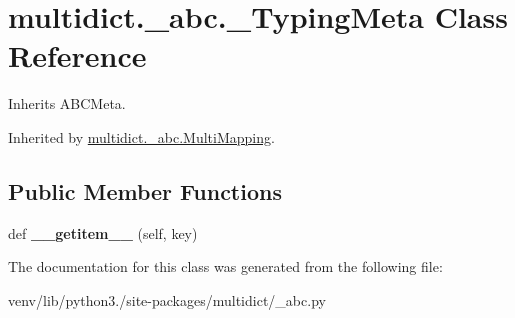 \hypertarget{classmultidict_1_1__abc_1_1___typing_meta}{}\section{multidict.\+\_\+abc.\+\_\+\+Typing\+Meta Class Reference}
\label{classmultidict_1_1__abc_1_1___typing_meta}


Inherits A\+B\+C\+Meta.



Inherited by \hyperlink{classmultidict_1_1__abc_1_1_multi_mapping}{multidict.\+\_\+abc.\+Multi\+Mapping}.

\subsection*{Public Member Functions}
\begin{DoxyCompactItemize}
\item 
\mbox{\label{classmultidict_1_1__abc_1_1___typing_meta_af73b81de3a144937345887ea161f573c}} 
def {\bfseries \+\_\+\+\_\+getitem\+\_\+\+\_\+} (self, key)
\end{DoxyCompactItemize}


The documentation for this class was generated from the following file\+:\begin{DoxyCompactItemize}
\item 
venv/lib/python3./site-\/packages/multidict/\+\_\+abc.\+py\end{DoxyCompactItemize}
